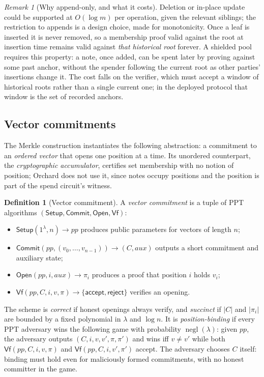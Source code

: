 \documentclass[11pt,a4paper]{article}
\theoremstyle{definition}
\newtheorem{definition}[theorem]{Definition}
\theoremstyle{remark}
\newtheorem{remark}[theorem]{Remark}
\DeclareMathOperator{\negl}{negl}
\providecommand{\abs}[1]{\lvert #1 \rvert}
\begin{document}
\begin{remark}[Why append-only, and what it costs]
\label{merkle:rem-append-only}
Deletion or in-place update could be supported at \(O(\log m)\) per
operation, given the relevant siblings; the restriction to appends is a
design choice, made for monotonicity. Once a leaf is inserted it is never
removed, so a membership proof valid against the root at insertion time
remains valid against \emph{that historical root} forever. A shielded
pool requires this property: a note, once added, can be spent later by
proving against some past anchor, without the spender following the
current root as other parties' insertions change it. The cost falls on
the verifier, which must accept a window of historical roots rather
than a single current one; in the deployed protocol that window is the
set of recorded anchors.
\end{remark}

\subsection{Vector commitments}\label{merkle:sec-vc}

The Merkle construction instantiates the following abstraction: a
commitment to an \emph{ordered vector} that opens one position at a
time. Its unordered counterpart, the \emph{cryptographic accumulator},
certifies set membership with no notion of position; Orchard does not
use it, since notes occupy positions and the position is part of the
spend circuit's witness.

\begin{definition}[Vector commitment]\label{merkle:def-vc}
A \emph{vector commitment} is a tuple of PPT algorithms
\((\mathsf{Setup}, \mathsf{Commit}, \mathsf{Open}, \mathsf{Vf})\):
\begin{itemize}
\item \(\mathsf{Setup}(1^{\lambda}, n) \to \mathit{pp}\) produces
  public parameters for vectors of length \(n\);
\item \(\mathsf{Commit}(\mathit{pp}, (v_0, \dots, v_{n-1})) \to
  (C, \mathit{aux})\) outputs a short commitment and auxiliary state;
\item \(\mathsf{Open}(\mathit{pp}, i, \mathit{aux}) \to \pi_i\)
  produces a proof that position \(i\) holds \(v_i\);
\item \(\mathsf{Vf}(\mathit{pp}, C, i, v, \pi) \to
  \{\mathsf{accept}, \mathsf{reject}\}\) verifies an opening.
\end{itemize}
The scheme is \emph{correct} if honest openings always verify, and
\emph{succinct} if \(\abs{C}\) and \(\abs{\pi_i}\) are bounded by a
fixed polynomial in \(\lambda\) and \(\log n\). It is
\emph{position-binding} if every PPT adversary wins the following
game with probability \(\negl(\lambda)\): given \(\mathit{pp}\), the
adversary outputs \((C, i, v, v', \pi, \pi')\) and wins iff
\(v \neq v'\) while both
\(\mathsf{Vf}(\mathit{pp}, C, i, v, \pi)\) and
\(\mathsf{Vf}(\mathit{pp}, C, i, v', \pi')\) accept. The adversary
chooses \(C\) itself: binding must hold even for maliciously formed
commitments, with no honest committer in the game.
\end{definition}
\end{document}
